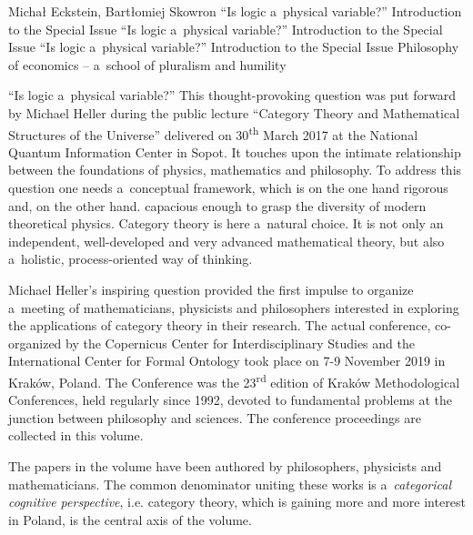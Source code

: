 \begin{editorialeng}{Michał Eckstein, Bartłomiej Skowron}
	{``Is logic a~physical variable?'' Introduction to the Special Issue}
	{``Is logic a~physical variable?'' Introduction to the Special Issue}
	{``Is logic a~physical variable?'' Introduction to the Special Issue}
	{Philosophy of economics -- a~school of pluralism and humility}
	
	


\lettrine[loversize=0.13,lines=2,lraise=-0.03,nindent=0em,findent=0.2pt]%
{``I}{}s logic a~physical variable?'' This thought-provoking question was put forward by Michael Heller during the public lecture ``Category Theory and Mathematical Structures of the Universe'' delivered on 30\textsuperscript{th} March 2017 at the National Quantum Information Center in Sopot. It touches upon the intimate relationship between the foundations of physics, mathematics and philosophy. To address this question one needs a~conceptual framework, which is on the one hand rigorous and, on the other hand. capacious enough to grasp the diversity of modern theoretical physics. Category theory is here a~natural choice. It is not only an independent, well-developed and very advanced mathematical theory, but also a~holistic, process-oriented way of thinking.

Michael Heller's inspiring question provided the first impulse to organize a~meeting of mathematicians, physicists and philosophers interested in exploring the applications of category theory in their research. The actual conference, co-organized by the Copernicus Center for Interdisciplinary Studies and the International Center for Formal Ontology took place on 7-9 November 2019 in Kraków, Poland. The Conference was the 23\textsuperscript{rd} edition of Kraków Methodological Conferences, held regularly since 1992, devoted to fundamental problems at the junction between philosophy and sciences. The conference proceedings are collected in this volume.

The papers in the volume have been authored by philosophers, physicists and mathematicians. The common denominator uniting these works is a~\textit{categorical cognitive perspective}, i.e. category theory, which is gaining more and more interest in Poland, is the central axis of the volume.


\end{editorialeng}

